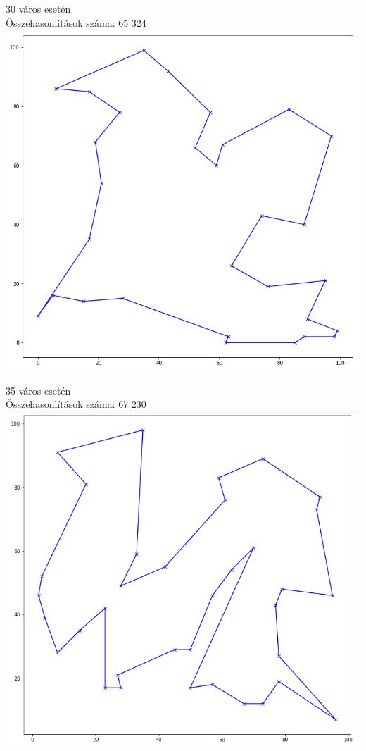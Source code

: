 \documentclass[12pt,a4paper]{article}
\begin{document}
\begin{flushleft}
30 város esetén \\
Összehasonlítások száma: 65 324
\includegraphics[scale=0.4]{30.png}
\end{flushleft}

\begin{flushleft}
35 város esetén \\
Összehasonlítások száma: 67 230
\includegraphics[scale=0.4]{35.png}
\end{flushleft}
\end{document}

